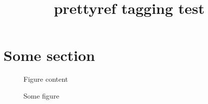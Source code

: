 \documentclass{article}
\title{prettyref tagging test}
\begin{document}
\section{Some section}
\label{sec:some}

\begin{figure}
Figure content
\caption{Some figure}
\label{fig:some}
\end{figure}


\end{document}
